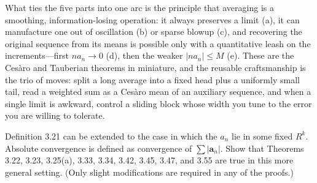 \documentclass[main.tex]{subfiles}
\begin{document}
\begin{Reflection}
What ties the five parts into one arc is the principle that averaging is a smoothing, information-losing
operation: it always preserves a limit (a), it can manufacture one out of oscillation (b) or sparse blowup
(c), and recovering the original sequence from its means is possible only with a quantitative leash on the
increments---first $na_{n}\to 0$ (d), then the weaker $|na_{n}|\le M$ (e). These are the Ces\`aro and
Tauberian theorems in miniature, and the reusable craftsmanship is the trio of moves: split a long average
into a fixed head plus a uniformly small tail, read a weighted sum as a Ces\`aro mean of an auxiliary
sequence, and when a single limit is awkward, control a sliding block whose width you tune to the error you
are willing to tolerate.
\end{Reflection}

Definition 3.21 can be extended to the case in which the $a_{n}$ lie in some fixed $R^{k}$. Absolute
convergence is defined as convergence of $\sum |\mathbf{a}_{n}|$. Show that Theorems 3.22, 3.23,
3.25(a), 3.33, 3.34, 3.42, 3.45, 3.47, and 3.55 are true in this more general setting. (Only slight
modifications are required in any of the proofs.)
\end{document}
